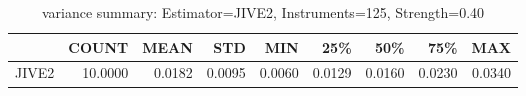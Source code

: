 \begin{table}[ht]
\centering
\caption{variance summary: Estimator=JIVE2, Instruments=125, Strength=0.40}
\begin{tabular}{lrrrrrrrr}
\toprule
 & COUNT & MEAN & STD & MIN & 25\% & 50\% & 75\% & MAX \\
\midrule
JIVE2 & 10.0000 & 0.0182 & 0.0095 & 0.0060 & 0.0129 & 0.0160 & 0.0230 & 0.0340 \\
\bottomrule
\end{tabular}
\end{table}
